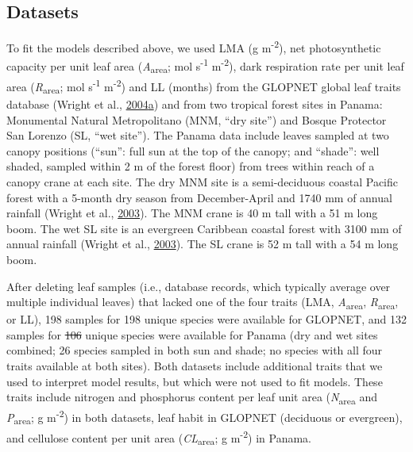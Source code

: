 \documentclass[12pt,]{article}
\theoremstyle{definition}
\theoremstyle{definition}
\theoremstyle{definition}
\theoremstyle{remark}
\providecommand{\DIFaddtex}[1]{{\protect\color{blue}\uwave{#1}}} %
\providecommand{\DIFdeltex}[1]{{\protect\color{red}\sout{#1}}}                      %
\providecommand{\DIFaddbegin}{} %
\providecommand{\DIFaddend}{} %
\providecommand{\DIFdelbegin}{} %
\providecommand{\DIFdelend}{} %
\providecommand{\DIFadd}[1]{\texorpdfstring{\DIFaddtex{#1}}{#1}} %
\providecommand{\DIFdel}[1]{\texorpdfstring{\DIFdeltex{#1}}{}} %
\newcommand{\DIFscaledelfig}{0.5}
\newlength{\DIFdelgraphicswidth} %
\newlength{\DIFdelgraphicsheight} %
\newcommand{\DIFaddincludegraphics}[2][]{{\color{blue}\fbox{\DIFOincludegraphics[#1]{#2}}}} %
\newcommand{\DIFdelincludegraphics}[2][]{%
\sbox{\DIFdelgraphicsbox}{\DIFOincludegraphics[#1]{#2}}%
\settoboxwidth{\DIFdelgraphicswidth}{\DIFdelgraphicsbox} %
\settoboxtotalheight{\DIFdelgraphicsheight}{\DIFdelgraphicsbox} %
\scalebox{\DIFscaledelfig}{%
\parbox[b]{\DIFdelgraphicswidth}{\usebox{\DIFdelgraphicsbox}\\[-\baselineskip] \rule{\DIFdelgraphicswidth}{0em}}\llap{\resizebox{\DIFdelgraphicswidth}{\DIFdelgraphicsheight}{%
\setlength{\unitlength}{\DIFdelgraphicswidth}%
\begin{picture}(1,1)%
\thicklines\linethickness{2pt} %
{\color[rgb]{1,0,0}\put(0,0){\framebox(1,1){}}}%
{\color[rgb]{1,0,0}\put(0,0){\line( 1,1){1}}}%
{\color[rgb]{1,0,0}\put(0,1){\line(1,-1){1}}}%
\end{picture}%
}\hspace*{3pt}}} %
} %
\DeclareRobustCommand{\DIFaddbegin}{\DIFOaddbegin \let\includegraphics\DIFaddincludegraphics} %
\DeclareRobustCommand{\DIFaddend}{\DIFOaddend \let\includegraphics\DIFOincludegraphics} %
\DeclareRobustCommand{\DIFdelbegin}{\DIFOdelbegin \let\includegraphics\DIFdelincludegraphics} %
\DeclareRobustCommand{\DIFdelend}{\DIFOaddend \let\includegraphics\DIFOincludegraphics} %
\begin{document}
\begin{itemize}
\hypertarget{datasets}{%
\subsection{Datasets}\label{datasets}}

To fit the models described above, we used LMA (g
m\textsuperscript{-2}), net photosynthetic capacity per unit leaf area
(\emph{A}\textsubscript{area}; mol s\textsuperscript{-1}
m\textsuperscript{-2}), dark respiration rate per unit leaf area
(\emph{R}\textsubscript{area}; mol s\textsuperscript{-1}
m\textsuperscript{-2}) and LL (months) from the GLOPNET global leaf
traits database (Wright et al.,
\protect\DIFdelbegin %
\DIFdelend \DIFaddbegin \hyperlink{ref-Wright2004a}{2004}\protect\hyperlink{ref-Wright2004a}{a}\DIFaddend )
and from two tropical forest sites in Panama: Monumental Natural
Metropolitano (MNM, ``dry site'') and Bosque Protector San Lorenzo (SL,
``wet site''). The Panama data include leaves sampled at two canopy
positions (``sun'': full sun at the top of the canopy; and ``shade'':
well shaded, sampled within 2 m of the forest floor) from trees within
reach of a canopy crane at each site. The dry MNM site is a
semi-deciduous coastal Pacific forest with a 5-month dry season from
December-April and 1740 mm of annual rainfall (Wright et al.,
\protect\hyperlink{ref-Wright2003}{2003}). The MNM crane is 40 m tall
with a 51 m long boom. The wet SL site is an evergreen Caribbean coastal
forest with 3100 mm of annual rainfall (Wright et al.,
\protect\hyperlink{ref-Wright2003}{2003}). The SL crane is 52 m tall
with a 54 m long boom.

After deleting leaf samples (i.e., database records, which typically
average over multiple individual leaves) that lacked one of the four
traits (LMA, \emph{A}\textsubscript{area}, \emph{R}\textsubscript{area},
or LL), 198 samples for 198 unique species were available for GLOPNET,
and 132 samples for \DIFdelbegin \DIFdel{106 }\DIFdelend \DIFaddbegin \DIFadd{105 }\DIFaddend unique species were available for Panama (dry
and wet sites combined; 26 species sampled in both sun and shade; no
species with all four traits available at both sites). Both datasets
include additional traits that we used to interpret model results, but
which were not used to fit models. These traits include nitrogen and
phosphorus content per leaf unit area (\emph{N}\textsubscript{area} and
\emph{P}\textsubscript{area}; g m\textsuperscript{-2}) in both datasets,
leaf habit in GLOPNET (deciduous or evergreen), and cellulose content
per unit area (\emph{CL}\textsubscript{area}; g m\textsuperscript{-2})
in Panama.


\end{itemize}
\end{document}
